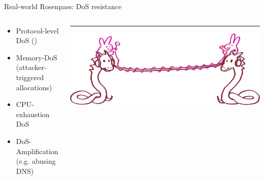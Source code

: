 \begin{frame}{Real-world Rosenpass: DoS resistance}
\begin{columns}[]
    \begin{column}{.7\textwidth}
      \centering
      \begin{minipage}{\textwidth}
        \begin{itemize}
          \item Protocol-level DoS ()
          \item Memory-DoS (attacker-triggered allocations)
          \item CPU-exhaustion DoS
          \item DoS-Amplification (e.g. abusing DNS)
        \end{itemize}
      \end{minipage}
    \end{column}
    \begin{column}{.2\textwidth}
      \rule{.4pt}{.45\textheight}\includegraphics[width=\textwidth-.4pt,clip,trim=2300 0 0 0]{graphics/wireguard-and-rp-bunny-rose.png}
    \end{column}
  \end{columns}
\end{frame}

